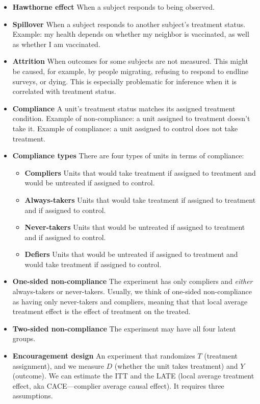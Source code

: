 \documentclass[12pt,]{book}
\providecommand{\tightlist}{%
  \setlength{\itemsep}{0pt}\setlength{\parskip}{0pt}}
\begin{document}
\begin{itemize}
\tightlist
\item
  \textbf{Hawthorne effect} When a subject responds to being observed.
\item
  \textbf{Spillover} When a subject responds to another subject's treatment status.
  Example: my health depends on whether my neighbor is vaccinated, as well as
  whether I am vaccinated.
\item
  \textbf{Attrition} When outcomes for some subjects are not measured. This might be caused, for example, by people migrating, refusing to respond to endline surveys, or dying. This is especially problematic for inference when it is correlated with treatment status.
\item
  \textbf{Compliance} A unit's treatment status matches its assigned treatment
  condition. Example of non-compliance: a unit assigned to treatment doesn't
  take it. Example of compliance: a unit assigned to control does not take
  treatment.
\item
  \textbf{Compliance types} There are four types of units in terms of compliance:

  \begin{itemize}
  \tightlist
  \item
    \textbf{Compliers} Units that would take treatment if assigned to treatment and would be untreated if assigned to control.
  \item
    \textbf{Always-takers} Units that would take treatment if assigned to treatment and if assigned to control.
  \item
    \textbf{Never-takers} Units that would be untreated if assigned to treatment and if assigned to control.
  \item
    \textbf{Defiers} Units that would be untreated if assigned to treatment and
    would take treatment if assigned to control.
  \end{itemize}
\item
  \textbf{One-sided non-compliance} The experiment has only compliers and
  \emph{either} always-takers or never-takers. Usually, we think of
  one-sided non-compliance as having only never-takers and compliers, meaning
  that that local average treatment effect is the effect of treatment on the
  treated.
\item
  \textbf{Two-sided non-compliance} The experiment may have all four latent groups.
\item
  \textbf{Encouragement design} An experiment that randomizes \(T\) (treatment
  assignment), and we measure \(D\) (whether the unit takes treatment) and \(Y\)
  (outcome). We can estimate the ITT and the LATE (local average treatment
  effect, aka CACE---complier average causal effect). It requires three
  assumptions.


\end{itemize}
\end{document}
